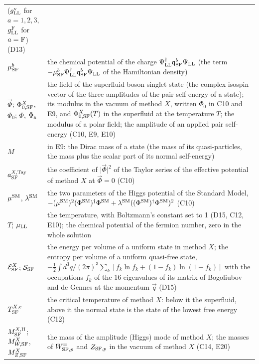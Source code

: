 \documentclass[
  10pt,
]{article}
\begin{document}
\begin{longtable}[]{@{}
  >{\raggedright\arraybackslash}p{}
  >{\raggedright\arraybackslash}p{}@{}}
(\(g^{\rm v}_{\rm LL}\) for \(a=1,2,3\), \(g^{\rm F}_{\rm LL}\) for
\(a={\rm F}\)) (D13) \\
\(\mu^b_{\rm SF}\) & the chemical potential of the charge
\(\Psi^\dagger_{\rm LL}\mathsf q^b_{\rm SF}\Psi_{\rm LL}\) (the term
\(-\mu^b_{\rm SF}\Psi^\dagger_{\rm LL}\mathsf q^b_{\rm SF}\Psi_{\rm LL}\)
of the Hamiltonian density) \\
\(\vec\Phi\); \(\Phi^X_{0,{\rm SF}}\), \(\Phi_0\); \(\Phi\),
\(\Phi_{\rm a}\) & the field of the superfluid boson singlet state (the
complex isospin vector of the three amplitudes of the pair self-energy
of a state); its modulus in the vacuum of method \(X\), written
\(\Phi_0\) in C10 and E9, and \(\Phi^X_{0,{\rm SF}}(T)\) in the
superfluid at the temperature \(T\); the modulus of a polar field; the
amplitude of an applied pair self-energy (C10, E9, E10) \\
\(M\) & in E9: the Dirac mass of a state (the mass of its
quasi-particles, the mass plus the scalar part of its normal
self-energy) \\
\(a^{X,{\rm Tay}}_{\rm SF}\) & the coefficient of
\(\lvert\vec\Phi\rvert^2\) of the Taylor series of the effective
potential of method \(X\) at \(\vec\Phi=0\) (C10) \\
\(\mu^{\rm SM}\), \(\lambda^{\rm SM}\) & the two parameters of the Higgs
potential of the Standard Model,
\(-(\mu^{\rm SM})^2(\Phi^{\rm SM})^\dagger\Phi^{\rm SM}+\lambda^{\rm SM}((\Phi^{\rm SM})^\dagger\Phi^{\rm SM})^2\)
(C10) \\
\(T\); \(\mu_{\rm LL}\) & the temperature, with Boltzmann's constant set
to 1 (D15, C12, E10); the chemical potential of the fermion number, zero
in the whole solution \\
\(\mathcal E^X_{\rm SF}\); \(\mathcal S_{\rm SF}\) & the energy per
volume of a uniform state in method \(X\); the entropy per volume of a
uniform quasi-free state,
\(-\tfrac12\int d^3q/(2\pi)^3\sum_k[f_k\ln f_k+(1-f_k)\ln(1-f_k)]\) with
the occupations \(f_k\) of the 16 eigenvalues of its matrix of
Bogoliubov and de Gennes at the momentum \(\vec q\) (D15) \\
\(T^{X,{\rm c}}_{\rm SF}\) & the critical temperature of method \(X\):
below it the superfluid, above it the normal state is the state of the
lowest free energy (C12) \\
\(M^{X,{\rm H}}_{\rm SF}\); \(M^X_{W,{\rm SF}}\), \(M^X_{Z,{\rm SF}}\) &
the mass of the amplitude (Higgs) mode of method \(X\); the masses of
\(W^\pm_{{\rm SF},p}\) and \(Z_{{\rm SF},p}\) in the vacuum of method
\(X\) (C14, E20) \\

\end{longtable}
\end{document}
